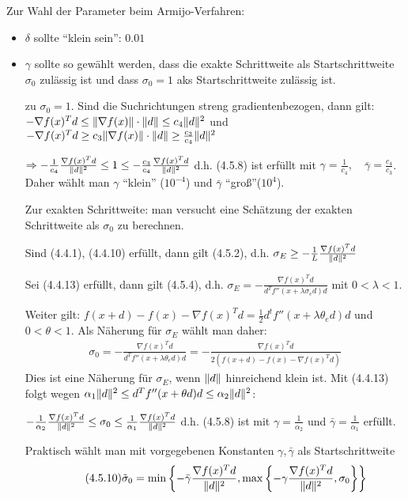 \documentclass[ngerman,halfparskip]{scrartcl}
\DeclarePairedDelimiter{\norm}{\lVert}{\rVert}
\theoremstyle{definition}
\begin{document}
Zur Wahl der Parameter beim Armijo-Verfahren:
\begin{itemize}
\item $\delta$ sollte "`klein sein"': $0.01$
\item $\gamma$ sollte so gewählt werden, dass die exakte Schrittweite als Startschrittweite $\sigma_0$ zulässig ist und dass $\sigma_0=1$ aks Startschrittweite zulässig ist.

zu $\sigma_0=1$. Sind die Suchrichtungen streng gradientenbezogen, dann gilt: $-\nabla f(x)^Td\leq \norm{\nabla f(x)}\cdot \norm{d} \leq c_4 \norm{d}^2$ und $-\nabla f(x)^Td\geq c_3\norm{\nabla f(x)}\cdot \norm{d} \geq \frac{c_3}{c_4} \norm{d}^2$

$\Rightarrow -\frac 1{c_4} \frac {\nabla f(x)^Td}{\norm{d}^2}\leq 1 \leq -\frac {c_3}{c_4} \frac {\nabla f(x)^Td}{\norm{d}^2}$ d.h. (4.5.8) ist erfüllt mit $\gamma=\frac 1{c_4},\quad \bar\gamma=\frac{c_4}{c_3}$. Daher wählt man $\gamma$ "`klein"' ($10^{-4}$) und $\bar\gamma$ "`groß"'($10^4$).

Zur exakten Schrittweite: man versucht eine Schätzung der exakten Schrittweite als $\sigma_0$ zu berechnen.

Sind (4.4.1), (4.4.10) erfüllt, dann gilt (4.5.2), d.h. $\sigma_E\geq -\frac 1L \frac {\nabla f(x)^Td}{\norm{d}^2}$

Sei (4.4.13) erfüllt, dann gilt (4.5.4), d.h. $\sigma_E=-\frac {\nabla f(x)^Td}{d^Tf''(x+\lambda\sigma_e d)d}$ mit $0<\lambda < 1$.

Weiter gilt: $f(x+d)-f(x)-\nabla f(x)^Td=\frac 12 d^tf''(x+\lambda \theta _e d)d$ und $0<\theta<1$. Als Näherung für $\sigma_E$ wählt man daher:
\begin{gather*}\tag{4.5.9}
\sigma_0=- \frac {\nabla f(x)^Td}{d^Tf''(x+\lambda\theta_e d)d}=-\frac {\nabla f(x)^Td}{2(f(x+d)-f(x)-\nabla f(x)^Td)}
\end{gather*}
Dies ist eine Näherung für $\sigma_E$, wenn $\norm{d}$ hinreichend klein ist. Mit (4.4.13) folgt wegen $\alpha_1\norm{d}^2\leq d^T f''(x+\theta d)d \leq \alpha_2 \norm{d}^2$:

$-\frac 1{\alpha_2} \frac {\nabla f(x)^Td}{\norm{d}^2} \leq \sigma_0 \leq \frac 1{\alpha_1}\frac {\nabla f(x)^Td}{\norm{d}^2}$ d.h. (4.5.8) ist mit $\gamma=\frac 1{\alpha_2}$ und $\bar\gamma=\frac 1{\alpha_1}$ erfüllt. 

Praktisch wählt man mit vorgegebenen Konstanten $\gamma,\bar\gamma$ als Startschrittweite
\begin{gather*}\tag{4.5.10}
\tilde\sigma_0=\min \left\{-\bar \gamma \frac {\nabla f(x)^Td}{\norm{d}^2}, \max \left\{-\gamma \frac {\nabla f(x)^Td}{\norm{d}^2},\sigma_0 \right\}\right\}
\end{gather*}
\end{itemize}
\end{document}
